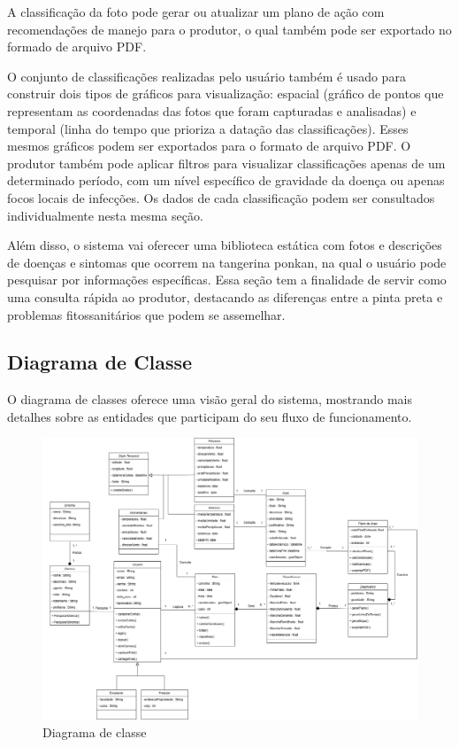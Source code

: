 \documentclass[
  a4paper,%
  12pt,%
  english,%
  brazilian,%
]{article}
\begin{document}
    A classificação da foto pode gerar ou atualizar um plano de ação com recomendações de manejo para o produtor, o qual também pode ser exportado no formado de arquivo PDF.

    O conjunto de classificações realizadas pelo usuário também é usado para construir dois tipos de gráficos para visualização: espacial (gráfico de pontos que representam as coordenadas das fotos que foram capturadas e analisadas) e temporal (linha do tempo que prioriza a datação das classificações). 
    Esses mesmos gráficos podem ser exportados para o formato de arquivo PDF. O produtor também pode aplicar filtros para visualizar classificações apenas de um determinado período, com um nível específico de gravidade da doença ou apenas focos locais de infecções.
    Os dados de cada classificação podem ser consultados individualmente nesta mesma seção. 

    Além disso, o sistema vai oferecer uma biblioteca estática com fotos e descrições de doenças e sintomas que ocorrem na tangerina ponkan, na qual o usuário pode pesquisar por informações específicas. Essa seção tem a finalidade de servir como uma consulta rápida ao produtor, destacando as diferenças entre a pinta preta e problemas fitossanitários que podem se assemelhar.

    \subsection*{Diagrama de Classe}

    O diagrama de classes oferece uma visão geral do sistema, mostrando mais detalhes sobre as entidades que participam do seu fluxo de funcionamento.
    
    


    \begin{figure}[h]
\centering
\caption{Diagrama de classe}%
\label{fig:diagrama-classe}
 \includegraphics[width=1.0\textwidth]{Logos/classes_blackspot.png}
\end{figure}
\end{document}
